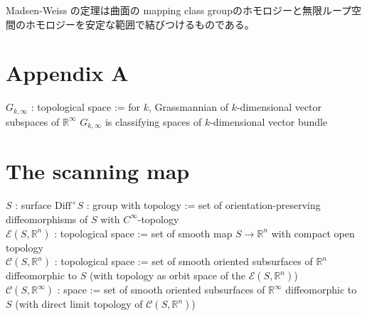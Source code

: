 \documentclass[dvipdfmx]{jsarticle}
\begin{document}
Madsen-Weiss の定理は曲面の mapping class groupのホモロジーと無限ループ空間のホモロジーを安定な範囲で結びつけるものである。

\section*{Appendix A}

\begin{Theorem}
\itemdefi
  \Define \(G_{k, \infty}\) : topological space := for \(k\), Grassmannian of \(k\)-dimensional vector subspaces of \(\mathbb{R}^\infty\)
\itemprop
  \Then \(G_{k, \infty}\) is classifying spaces of \(k\)-dimensional vector bundle
\end{Theorem}

\section*{The scanning map}

\begin{Definition}
\itemwhen
  \For \(S\) : surface
\itemdefi
  \Define \(\text{Diff}^{+} S\) : group with topology := set of orientation-preserving diffeomorphisms of \(S\) with \(C^\infty\)-topology \\
  \Define \(\mathcal{E}(S, \mathbb{R}^n)\) : topological space := set of smooth map \(S \to \mathbb{R}^n\) with compact open topology \\
  \Define \(\mathcal{C}(S, \mathbb{R}^n)\) : topological space := set of smooth oriented subsurfaces of \(\mathbb{R}^n\) diffeomorphic to \(S\) (with topology as orbit space of the \(\mathcal{E}(S ,\mathbb{R}^n)\)) \\
  \Define \(\mathcal{C}(S, \mathbb{R}^\infty)\) : space := set of smooth oriented subsurfaces of \(\mathbb{R}^\infty\) diffeomorphic to \(S\) (with direct limit topology of \(\mathcal{C}(S, \mathbb{R}^n)\))
\end{Definition}
\end{document}
